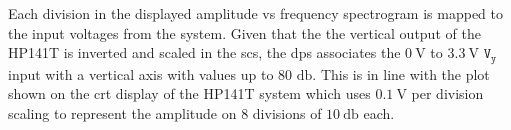 \documentclass[class=report,11pt,crop=false]{standalone}
\begin{document}
	Each division in the displayed amplitude vs frequency spectrogram is mapped to the input voltages from the system. Given that the the vertical output of the HP141T is inverted and scaled in the \acrshort{scs}, the \acrshort{dps} associates the $\SI{0}{\volt}$ to $\SI{3.3}{\volt}$ $\texttt{V}_\texttt{y}$ input with a vertical axis with values up to 80 $\si{\decibel}$. This is in line with the plot shown on the \acrshort{crt} display of the HP141T system which uses $\SI{0.1}{\volt}$ per division scaling to represent the amplitude on 8 divisions of $\SI{10}{\decibel}$ each. 
	\ifstandalone
	
	\printnoidxglossary[type=\acronymtype,nonumberlist]
	\fi
\end{document}
